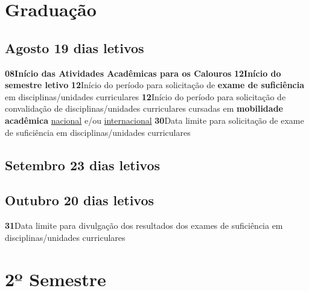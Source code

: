\documentclass[thesis]{hmcposter}
\begin{document}
\begin{poster}
\section{\color{hmcorange}Graduação}\subsection{Agosto \hfill 19 dias letivos}\textbf{08}\qquad \textbf{Início das Atividades Acadêmicas para os Calouros} \newline \null\textbf{12}\qquad \textbf{Início do semestre letivo} \newline \null\textbf{12}\qquad Início do período para solicitação de \textbf{exame de suficiência} em disciplinas/unidades curriculares \newline \null\textbf{12}\qquad Início do período para solicitação de convalidação de disciplinas/unidades curriculares cursadas em \textbf{mobilidade acadêmica} \underline{nacional} e/ou \underline{internacional} \newline \null\textbf{30}\qquad Data limite para solicitação de exame de suficiência em disciplinas/unidades curriculares \newline \null\subsection{Setembro \hfill 23 dias letivos}\subsection{Outubro \hfill 20 dias letivos}\textbf{31}\qquad Data limite para divulgação dos resultados dos exames de suficiência em disciplinas/unidades curriculares \newline \null\vfill\null
\columnbreak
\section{\hfill \color{hmcorange}2º Semestre}

\end{poster}
\end{document}
